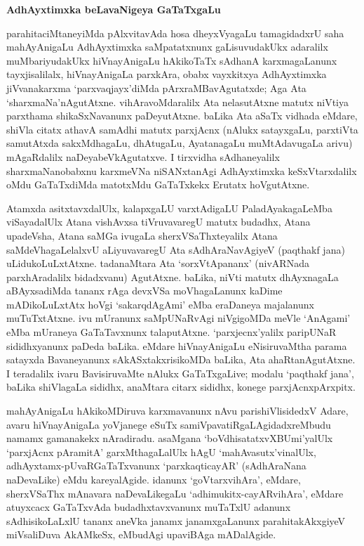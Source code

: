 \begin{center}
{\textbf{\Large AdhAyxtimxka beLavaNigeya GaTaTxgaLu}}
\end{center}

parahitaciMtaneyiMda pAlxvitavAda hosa dheyxVyagaLu tamagidadxrU saha mahAyAnigaLu AdhAyxtimxka saMpatatxnunx gaLisuvudakUkx adaralilx muMbariyudakUkx hiVnayAnigaLu hAkikoTaTx sAdhanA karxmagaLanunx tayxjisalilalx, hiVnayAnigaLa parxkAra, obabx vayxkitxya AdhAyxtimxka jiVvanakarxma `parxvaqjayx'diMda pArxraMBavAgutatxde; Aga Ata `sharxmaNa'nAgutAtxne. vihAravoMdaralilx Ata nelasutAtxne matutx niVtiya parxthama shikaSxNavanunx paDeyutAtxne. baLika Ata aSaTx vidhada eMdare, shiVla citatx athavA samAdhi matutx parxjAcnx (nAlukx satayxgaLu, parxtiVta samutAtxda sakxMdhagaLu, dhAtugaLu, AyatanagaLu muMtAdavugaLa arivu) mAgaRdalilx naDeyabeVkAgutatxve. I tirxvidha sAdhaneyalilx sharxmaNanobabxnu karxmeVNa niSANxtanAgi AdhAyxtimxka keSxVtarxdalilx oMdu GaTaTxdiMda matotxMdu GaTaTxkekx Erutatx hoVgutAtxne.

Atamxda asitxtavxdalUlx, kalapxgaLU varxtAdigaLU PaladAyakagaLeMba viSayadalUlx Atana vishAvxsa tiVruvavaregU matutx budadhx, Atana upadeVsha, Atana saMGa ivugaLa sherxVSaThxteyalilx Atana saMdeVhagaLelalxvU aLiyuvavaregU Ata sAdhAraNavAgiyeV (paqthakf jana) uLidukoLuLxtAtxne. tadanaMtara Ata `sorxVtApananx' (nivARNada parxhAradalilx bidadxvanu) AgutAtxne. baLika, niVti matutx dhAyxnagaLa aBAyxsadiMda tananx rAga devxVSa moVhagaLanunx kaDime mADikoLuLxtAtx hoVgi `sakarqdAgAmi' eMba eraDaneya majalanunx muTuTxtAtxne. ivu mUranunx saMpUNaRvAgi niVgigoMDa meVle `AnAgami' eMba mUraneya GaTaTavxnunx talaputAtxne. `parxjecnx'yalilx paripUNaR sididhxyanunx paDeda baLika. eMdare hiVnayAnigaLu eNisiruvaMtha parama satayxda Bavaneyanunx sAkASxtakxrisikoMDa baLika, Ata ahaRtanAgutAtxne. I teradalilx ivaru BavisiruvaMte nAlukx GaTaTxgaLive; modalu `paqthakf jana', baLika shiVlagaLa sididhx, anaMtara citarx sididhx, konege parxjAcnxpArxpitx.

mahAyAnigaLu hAkikoMDiruva karxmavanunx nAvu parishiVlisidedxV Adare, avaru hiVnayAnigaLa yoVjanege eSuTx samiVpavatiRgaLAgidadxreMbudu namamx gamanakekx nAradiradu. asaMgana `boVdhisatatxvXBUmi'yalUlx `parxjAcnx pAramitA' garxMthagaLalUlx hAgU `mahAvasutx'vinalUlx, adhAyxtamx-pUvaRGaTaTxvanunx `parxkaqticayAR' (sAdhAraNana naDevaLike) eMdu kareyalAgide. idanunx `goVtarxvihAra', eMdare, sherxVSaThx mAnavara naDevaLikegaLu `adhimukitx-cayARvihAra', eMdare atuyxcacx GaTaTxvAda budadhxtavxvanunx muTaTxlU adanunx sAdhisikoLaLxlU tananx aneVka janamx janamxgaLanunx parahitakAkxgiyeV miVsaliDuva AkAMkeSx, eMbudAgi upaviBAga mADalAgide.

